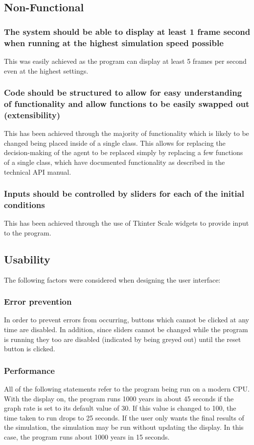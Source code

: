 \documentclass[12pt]{article}
\begin{document}
		\subsection{Non-Functional}
			\subsubsection{The system should be able to display at least 1 frame second when running at the highest simulation speed possible}
				This was easily achieved as the program can display at least 5 frames per second even at the highest settings.
			\subsubsection{Code should be structured to allow for easy understanding of functionality and allow functions to be easily swapped out (extensibility)}
				This has been achieved through the majority of functionality which is likely to be changed being placed inside of a single class. This allows for replacing the decision-making of the agent to be replaced simply by replacing a few functions of a single class, which have documented functionality as described in the technical API manual.
			\subsubsection{Inputs should be controlled by sliders for each of the initial conditions}
				This has been achieved through the use of Tkinter Scale widgets to provide input to the program.
			
		\subsection{Usability}
			The following factors were considered when designing the user interface:
			\subsubsection{Error prevention}
				In order to prevent errors from occurring, buttons which cannot be clicked at any time are disabled. In addition, since sliders cannot be changed while the program is running they too are disabled (indicated by being greyed out) until the reset button is clicked. 
			\subsubsection{Performance}
				All of the following statements refer to the program being run on a modern CPU. With the display on, the program runs 1000 years in about 45 seconds if the graph rate is set to its default value of 30. If this value is changed to 100, the time taken to run drops to 25 seconds. If the user only wants the final results of the simulation, the simulation may be run without updating the display. In this case, the program runs about 1000 years in 15 seconds. 
\end{document}
